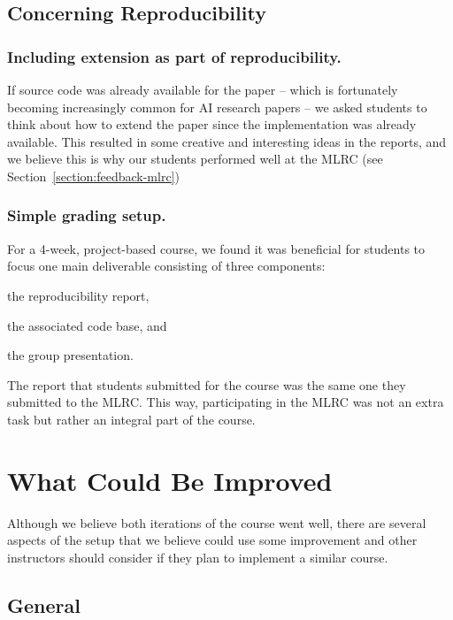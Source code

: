 \subsection{Concerning Reproducibility}

\subsubsection{Including extension as part of reproducibility.}
If source code was already available for the paper -- which is fortunately becoming increasingly common for AI research papers -- we asked students to think about how to extend the paper since the implementation was already available. This resulted in some creative and interesting ideas in the reports, and we believe this is why our students performed well at the MLRC (see Section~\ref{section:feedback-mlrc})

\subsubsection{Simple grading setup.}
For a 4-week, project-based course, we found it was beneficial for students to focus one main deliverable consisting of three components: 
\begin{enumerate*}[label=(\roman*)]
\item the reproducibility report, 
\item the associated code base, and
\item the group presentation. 
\end{enumerate*}
The report that students submitted for the course was the same one they submitted to the MLRC. This way, participating in the MLRC was not an extra task but rather an integral part of the course. 


\section{What Could Be Improved}
\label{section:whatdidnt}


Although we believe both iterations of the course went well, there are several aspects of the setup that we believe could use some improvement and other instructors should consider if they plan to implement a similar course. 

\subsection{General}

